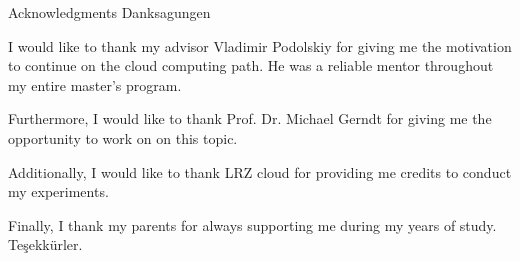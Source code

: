 \makeatletter
{}
{}
{}
\makeatother
\thispagestyle{empty}

\vspace*{20mm}

\begin{center}
\makeatletter
{}
{ Acknowledgments}
{ Danksagungen}
\makeatother
\end{center}

\vspace{10mm}

I would like to thank my advisor Vladimir Podolskiy for giving me the motivation to continue on the cloud computing path. He was a reliable mentor throughout my entire master's program.

Furthermore, I would like to thank Prof. Dr. Michael Gerndt for giving me the opportunity to work on on this topic.

Additionally, I would like to thank LRZ cloud for providing me credits to conduct my experiments.

Finally, I thank my parents for always supporting me during my years of study. Teşekkürler.

\cleardoublepage{}
